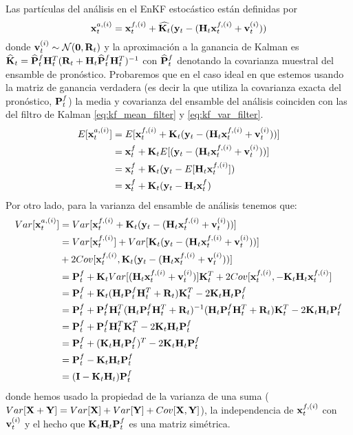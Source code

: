 Las partículas del análisis en el EnKF estocástico están definidas por 
$$ \mathbf{x}_t^{a, (i)} = \mathbf{x}_t^{f, (i)} + \widehat{\mathbf{K}_t} (\mathbf{y}_t - (\mathbf{H}_t \mathbf{x}_t^{f, (i)} + \mathbf{v}_t^{(i)}))$$
donde $\mathbf{v}_t^{(i)} \sim \mathcal{N}(\mathbf{0}, \mathbf{R}_t)$ y la aproximación a la ganancia de Kalman es $\widehat{\mathbf{K}}_t = \widehat{\mathbf{P}}_t^f \mathbf{H}_t^T(\mathbf{R}_t + \mathbf{H}_t \widehat{\mathbf{P}}_t^f \mathbf{H}_t^T)^{-1}$ con $\widehat{\mathbf{P}}_t^f$ denotando la covarianza muestral del ensamble de pronóstico. Probaremos que en el caso ideal en que estemos usando la matriz de ganancia verdadera (es decir la que utiliza la covarianza exacta del pronóstico, $\mathbf{P}_t^f$) la media y covarianza del ensamble del análisis coinciden con las del filtro de Kalman \ref{eq:kf_mean_filter} y \ref{eq:kf_var_filter}.
\begin{align*}
    E[\mathbf{x}_t^{a, (i)}] &= E[\mathbf{x}_t^{f, (i)} + \mathbf{K}_t (\mathbf{y}_t - (\mathbf{H}_t \mathbf{x}_t^{f, (i)} + \mathbf{v}_t^{(i)}))] \\
    &= \mathbf{x}_t^f + \mathbf{K}_t E[(\mathbf{y}_t - (\mathbf{H}_t \mathbf{x}_t^{f, (i)} + \mathbf{v}_t^{(i)}))] \\
    &= \mathbf{x}_t^f + \mathbf{K}_t (\mathbf{y}_t - E[\mathbf{H}_t \mathbf{x}_t^{f, (i)}]) \\
    &= \mathbf{x}_t^f + \mathbf{K}_t (\mathbf{y}_t - \mathbf{H}_t \mathbf{x}_t^f)
\end{align*}
Por otro lado, para la varianza del ensamble de análisis tenemos que:
\begin{align*}
    Var[\mathbf{x}_t^{a, (i)}] &= Var[\mathbf{x}_t^{f, (i)} + \mathbf{K}_t (\mathbf{y}_t - (\mathbf{H}_t \mathbf{x}_t^{f, (i)} + \mathbf{v}_t^{(i)}))] \\
    &= Var[\mathbf{x}_t^{f, (i)}] + Var[\mathbf{K}_t (\mathbf{y}_t - (\mathbf{H}_t \mathbf{x}_t^{f, (i)} + \mathbf{v}_t^{(i)}))] \\
    &+ 2 Cov[\mathbf{x}_t^{f, (i)}, \mathbf{K}_t (\mathbf{y}_t - (\mathbf{H}_t \mathbf{x}_t^{f, (i)} + \mathbf{v}_t^{(i)}))] \\
    &= \mathbf{P}_t^f + \mathbf{K}_t Var[(\mathbf{H}_t \mathbf{x}_t^{f, (i)} + \mathbf{v}_t^{(i)})]\mathbf{K}_t^T + 2 Cov[\mathbf{x}_t^{f, (i)}, - \mathbf{K}_t \mathbf{H}_t \mathbf{x}_t^{f, (i)}] \\ 
    &= \mathbf{P}_t^f + \mathbf{K}_t (\mathbf{H}_t \mathbf{P}_t^f \mathbf{H}_t^T + \mathbf{R}_t)\mathbf{K}_t^T - 2 \mathbf{K}_t \mathbf{H}_t \mathbf{P}_t^f \\
    &= \mathbf{P}_t^f + \mathbf{P}_t^f \mathbf{H}_t^T (\mathbf{H}_t \mathbf{P}_t^f \mathbf{H}_t^T + \mathbf{R}_t)^{-1}(\mathbf{H}_t \mathbf{P}_t^f \mathbf{H}_t^T + \mathbf{R}_t)\mathbf{K}_t^T - 2 \mathbf{K}_t \mathbf{H}_t \mathbf{P}_t^f \\
    &= \mathbf{P}_t^f + \mathbf{P}_t^f \mathbf{H}_t^T \mathbf{K}_t^T - 2 \mathbf{K}_t \mathbf{H}_t \mathbf{P}_t^f \\
    &= \mathbf{P}_t^f + (\mathbf{K}_t \mathbf{H}_t \mathbf{P}_t^f)^T - 2 \mathbf{K}_t \mathbf{H}_t \mathbf{P}_t^f \\
    &= \mathbf{P}_t^f - \mathbf{K}_t \mathbf{H}_t \mathbf{P}_t^f \\
    &= (\mathbf{I} - \mathbf{K}_t \mathbf{H}_t) \mathbf{P}_t^f 
\end{align*}
donde hemos usado la propiedad de la varianza de una suma ($Var[\mathbf{X} + \mathbf{Y}] = Var[\mathbf{X}] + Var[\mathbf{Y}] + Cov[\mathbf{X}, \mathbf{Y}]$), la independencia de $\mathbf{x}_t^{f, (i)}$ con $\mathbf{v}_t^{(i)}$ y el hecho que $\mathbf{K}_t \mathbf{H}_t \mathbf{P}_t^f$ es una matriz simétrica.

